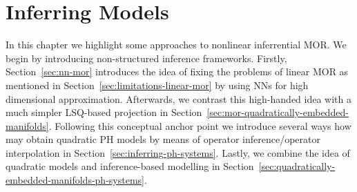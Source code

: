 \chapter{Inferring Models}\label{chap:inferring-models}

In this chapter we highlight some approaches to nonlinear inferrential \ac{MOR}.
We begin by introducing non-structured inference frameworks.
Firstly, Section~\ref{sec:nn-mor} introduces the idea of fixing the problems of linear MOR as mentioned in Section~\ref{sec:limitations-linear-mor} by using \acp{NN} for high dimensional approximation.
Afterwards, we contrast this high-handed idea with a much simpler \ac{LSQ}-based projection in Section~\ref{sec:mor-quadratically-embedded-manifolds}.
Following this conceptual anchor point we introduce several ways how may obtain quadratic \ac{PH} models by means of operator inference/operator interpolation in Section~\ref{sec:inferring-ph-systems}.
Lastly, we combine the idea of quadratic models and inference-based modelling in Section~\ref{sec:quadratically-embedded-manifolds-ph-systems}.






